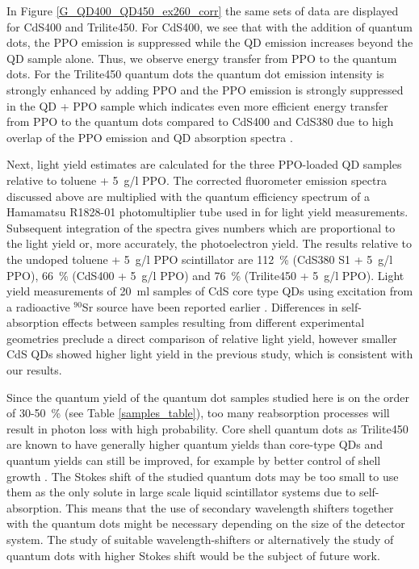 \documentclass[cits]{JINST}
\begin{document}
In Figure \ref{G_QD400_QD450_ex260_corr} the same sets of data are displayed for CdS400 and Trilite450. For CdS400, we see that with the addition of quantum dots, the PPO emission is suppressed while the QD emission increases beyond the QD sample alone. Thus, we observe energy transfer from PPO to the quantum dots. For the Trilite450 quantum dots the quantum dot emission intensity is strongly enhanced by adding PPO and the PPO emission is strongly suppressed in the QD + PPO sample which indicates even more efficient energy transfer from PPO to the quantum dots compared to CdS400 and CdS380 due to high overlap of the PPO emission and QD absorption spectra \cite{foerster}.  

Next, light yield estimates are calculated for the three PPO-loaded QD samples relative to toluene + 5~g/l PPO. The corrected fluorometer emission spectra discussed above are multiplied with the quantum efficiency spectrum of a Hamamatsu R1828-01 photomultiplier tube used in \cite{mitpaper} for light yield measurements. Subsequent integration of the spectra gives numbers which are proportional to the light yield or, more accurately, the photoelectron yield. The results relative to the undoped toluene + 5~g/l PPO scintillator are 112~\% (CdS380 S1 + 5~g/l PPO), 66~\% (CdS400 + 5~g/l PPO) and 76~\% (Trilite450 + 5~g/l PPO). Light yield measurements of 20~ml samples of CdS core type QDs using excitation from a radioactive $^{90}$Sr source have been reported earlier \cite{mitpaper}. Differences in self-absorption effects between samples resulting from different experimental geometries preclude a direct comparison of relative light yield, however smaller CdS QDs showed higher light yield in the previous study, which is consistent with our results. 
  
Since the quantum yield of the quantum dot samples studied here is on the order of 30-50~\% (see Table \ref{samples_table}), too many reabsorption processes will result in photon loss with high probability. Core shell quantum dots as Trilite450 are known to have generally higher quantum yields than core-type QDs \cite{swafford2006,dabbousi1997,obrien2011} and quantum yields can still be improved, for example by better control of shell growth \cite{mcbride2006}. The Stokes shift of the studied quantum dots may be too small to use them as the only solute in large scale liquid scintillator systems due to self-absorption. This means that the use of secondary wavelength shifters together with the quantum dots might be necessary depending on the size of the detector system. The study of suitable wavelength-shifters or alternatively the study of quantum dots with higher Stokes shift would be the subject of future work. 
\end{document}
